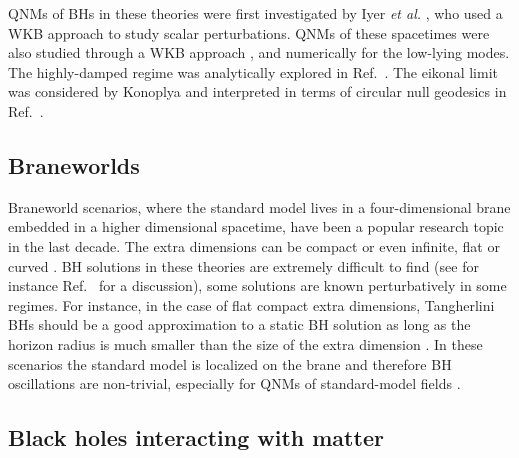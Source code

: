 \documentclass[]{iopart}
\begin{document}
QNMs of BHs in these theories were first investigated by Iyer {\it et al.}
\cite{Iyer:1989rd}, who used a WKB approach to study scalar
perturbations. QNMs of these spacetimes were also studied through a WKB
approach \cite{Abdalla:2005hu,Konoplya:2004xx,Chakrabarti:2006ei}, and
numerically \cite{Konoplya:2008ix,Abdalla:2005hu} for the low-lying modes.
The highly-damped regime was analytically explored in
Ref.~\cite{Daghigh:2006xg}. The eikonal limit was considered by Konoplya
\cite{Konoplya:2008ix} and interpreted in terms of circular null geodesics in
Ref.~\cite{Cardoso:2008bp}.

\subsection{Braneworlds}

Braneworld scenarios, where the standard model lives in a four-dimensional
brane embedded in a higher dimensional spacetime, have been a popular research
topic in the last decade. The extra dimensions can be compact
\cite{ArkaniHamed:1998rs,Antoniadis:1998ig} or even infinite, flat
\cite{Dvali:2000hr} or curved \cite{Randall:1999vf,Randall:1999ee}. BH
solutions in these theories are extremely difficult to find (see for instance
Ref.~\cite{Argyres:1998qn,Kaus:2009cg} for a discussion), some solutions are
known perturbatively in some regimes. For instance, in the case of flat
compact extra dimensions, Tangherlini BHs should be a good approximation to a
static BH solution as long as the horizon radius is much smaller than the size
of the extra dimension \cite{Argyres:1998qn}. In these scenarios the standard
model is localized on the brane and therefore BH oscillations are non-trivial,
especially for QNMs of standard-model fields
\cite{Clarkson:2005mg,Kanti:2005xa,Kanti:2006ua,alBinni:2007gk,Chen:2007jz,Nozawa:2008wf}.

\subsection{Black holes interacting with matter}
\end{document}
